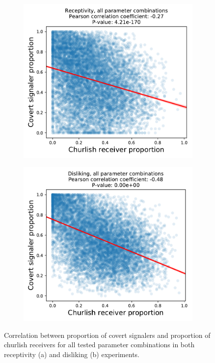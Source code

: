 \documentclass[11pt,letterpaper]{article}
\begin{document}
\begin{figure}[H]
  \centering
  \begin{subfigure}{0.49\textwidth}
    \centering
    \includegraphics[width=\textwidth]{Figures/receptivity_allcombos_reg.pdf}
    \caption{}
    \label{fig:}
  \end{subfigure}
  \begin{subfigure}{0.49\textwidth}
    \centering
    \includegraphics[width=\textwidth]{Figures/disliking_allcombos_reg.pdf}
    \caption{}
    \label{fig:}
  \end{subfigure}
  \caption{Correlation between proportion of covert signalers and proportion of
    churlish receivers for all tested parameter combinations in both 
    receptivity (a) and disliking (b) experiments.}
  \label{fig:regressions}
\end{figure}
\end{document}
